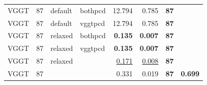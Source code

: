 \begin{table}[H]
\begin{tabular}{lrllrrrr}
VGGT & 87 & default & bothpcd & 12.794 & 0.785 & \textbf{87} &  \\
VGGT & 87 & default & vggtpcd & 12.794 & 0.785 & \textbf{87} &  \\
VGGT & 87 & relaxed & bothpcd & \textbf{0.135} & \textbf{0.007} & \textbf{87} &  \\
VGGT & 87 & relaxed & vggtpcd & \textbf{0.135} & \textbf{0.007} & \textbf{87} &  \\
VGGT & 87 & relaxed &  & \underline{0.171} & \underline{0.008} & \textbf{87} &  \\
VGGT & 87 &  &  & 0.331 & 0.019 & \textbf{87} & \textbf{0.699} \\
\bottomrule
\end{tabular}
\end{table}
